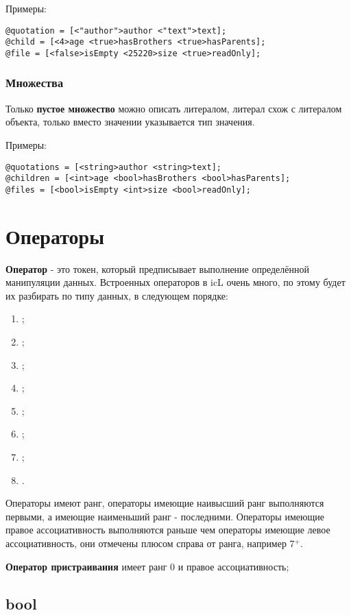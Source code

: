 \documentclass[a4paper, 14pt]{extarticle}
\newenvironment{icEnum}
	{ \begin{enumerate}[noitemsep,nolistsep] }
	{ \end{enumerate} }
\begin{document}
\noindent Примеры:
\begin{lstlisting}[numbers=none]
@quotation = [<"author">author <"text">text];
@child = [<4>age <true>hasBrothers <true>hasParents];
@file = [<false>isEmpty <25220>size <true>readOnly];
\end{lstlisting}

\subsubsection{Множества}

	Только {\bf пустое множество} можно описать литералом, литерал схож с литералом объекта, только вместо значении указывается тип значения.
	
\noindent Примеры:
\begin{lstlisting}[numbers=none]
@quotations = [<string>author <string>text];
@children = [<int>age <bool>hasBrothers <bool>hasParents];
@files = [<bool>isEmpty <int>size <bool>readOnly];
\end{lstlisting}

\newpage
\section{Операторы}

	{\bf Оператор} - это токен, который предписывает выполнение определённой манипуляции данных. Встроенных операторов в icL очень много, по этому будет их разбирать по типу данных, в следующем порядке:
\begin{icEnum}
	\item {};
	\item {};
	\item {};
	\item {};
	\item {};
	\item {};
	\item {};
	\item {}.
\end{icEnum}

	Операторы имеют ранг, операторы имеющие наивысший ранг выполняются первыми, а имеющие наименьший ранг - последними. Операторы имеющие правое ассоциативность выполняются раньше чем операторы имеющие левое ассоциативность, они отмечены плюсом справа от ранга, например 7$^+$.
	
	{\bf Оператор пристраивания} имеет ранг 0 и правое ассоциативность;

\subsection{\color{bluemarin}bool}
\end{document}
